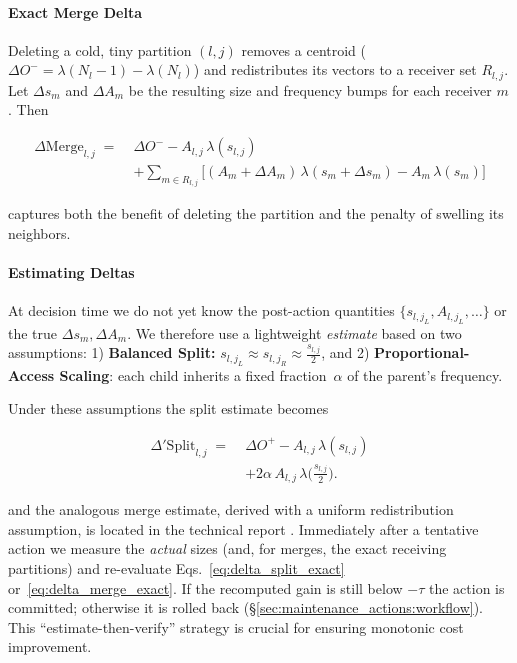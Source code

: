 \paragraph{Exact Merge Delta}
Deleting a cold, tiny partition $(l,j)$ removes a centroid
($\Delta O^{-}= \lambda(N_{l}-1)-\lambda(N_{l})$) and redistributes
its vectors to a receiver set $R_{l,j}$.  Let $\Delta s_{m}$ and
$\Delta A_{m}$ be the resulting size and frequency bumps for each
receiver $m$.  Then

\begin{equation}
\begin{aligned}
\Delta\text{Merge}_{l,j} \;=\;
  &\Delta O^{-} - A_{l,j}\,\lambda(s_{l,j}) \\
  &+ \sum_{m\in R_{l,j}}
     \bigl[(A_{m}{+}\Delta A_{m})\,
           \lambda(s_{m}{+}\Delta s_{m})
           - A_{m}\,\lambda(s_{m})\bigr]
\end{aligned}
\label{eq:delta_merge_exact}
\end{equation}

captures both the benefit of deleting the partition and the
penalty of swelling its neighbors.

\paragraph{Estimating Deltas}
At decision time we do not yet know the post-action quantities
$\{s_{l,j_L},A_{l,j_L},\dots\}$ or the true $\Delta s_{m},
\Delta A_{m}$.  We therefore use a lightweight \emph{estimate}
based on two assumptions: 1) \textbf{Balanced Split: } $s_{l,j_L}\!\approx\!s_{l,j_R}\!\approx\!\tfrac{s_{l,j}}{2}$, and 2) \textbf{Proportional-Access Scaling}: each child inherits a fixed
      fraction~$\alpha$ of the parent’s frequency.

Under these assumptions the split estimate becomes

\begin{equation}
\begin{aligned}
\Delta'\text{Split}_{l,j} \;=\;
  &\Delta O^{+}
  - A_{l,j}\,\lambda(s_{l,j}) \\
  &+ 2\alpha\,A_{l,j}\,
    \lambda\!\bigl(\tfrac{s_{l,j}}{2}\bigr).
\end{aligned}
\label{eq:delta_split_est}
\end{equation}

and the analogous merge estimate, derived with a uniform
redistribution assumption, is located in the technical report \cite{mohoney2025quakeadaptiveindexingvector}.
Immediately after a tentative action we measure the
\emph{actual} sizes (and, for merges, the exact receiving partitions) and
re-evaluate Eqs.~\eqref{eq:delta_split_exact}
or~\eqref{eq:delta_merge_exact}.  If the recomputed gain is still
below $-\tau$ the action is committed; otherwise it is rolled back
(\S\ref{sec:maintenance_actions:workflow}).  This “estimate-then-verify”
strategy is crucial for ensuring
monotonic cost improvement.

